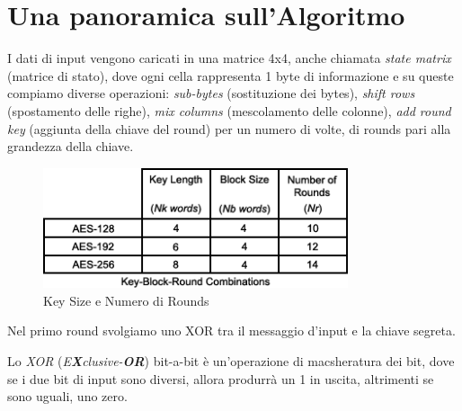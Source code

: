 


\section{Una panoramica sull'Algoritmo} %


\textsf{\small I dati di input vengono caricati in una matrice 4x4, anche chiamata \emph{state matrix} (matrice di stato), dove ogni cella rappresenta 1 byte di informazione e su queste compiamo diverse operazioni: \emph{sub-bytes} (sostituzione dei bytes), \emph{shift rows} (spostamento delle righe), \emph{mix columns} (mescolamento delle colonne), \emph{add round key} (aggiunta della chiave del round) per un numero di volte, di rounds pari alla grandezza della chiave.} %

\begin{figure}[H]
	\centering
	\includegraphics[width=0.8\textwidth, height=0.8\textheight, keepaspectratio]{./images/aes/key_size_and_number_of_rounds.png}
	\caption{Key Size e Numero di Rounds}
	\label{fig:aes_key_size_number_of_rounds}
\end{figure}

\textsf{\small Nel primo round svolgiamo uno XOR tra il messaggio d'input e la chiave segreta.}

\textsf{\small Lo \emph{XOR} (\emph{E\textbf{X}clusive-\textbf{OR}}) bit-a-bit è un'operazione di macsheratura dei bit, dove se i due bit di input sono diversi, allora produrrà un 1 in uscita, altrimenti se sono uguali, uno zero.} 


